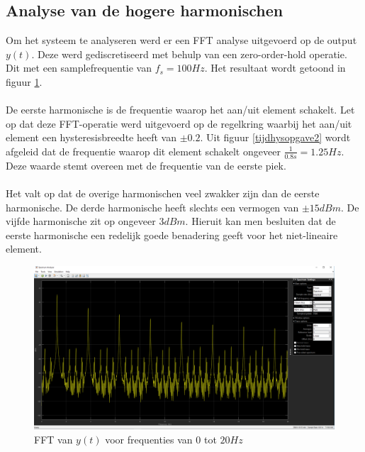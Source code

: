\documentclass[12pt]{article}
\begin{document}
\subsection{Analyse van de hogere harmonischen}
Om het systeem te analyseren werd er een FFT analyse uitgevoerd op de output $y(t)$. Deze werd gediscretiseerd met behulp van een zero-order-hold operatie. Dit met een samplefrequentie van $f_s = 100Hz$. Het resultaat wordt getoond in figuur \ref{spectrum}. \\ \\
De eerste harmonische is de frequentie waarop het aan/uit element schakelt. Let op dat deze FFT-operatie werd uitgevoerd op de regelkring waarbij het aan/uit element een hysteresisbreedte heeft van $\pm0.2$. Uit figuur \ref{tijdhysopgave2} wordt afgeleid dat de frequentie waarop dit element schakelt ongeveer $\frac{1}{0.8s} = 1.25Hz$. Deze waarde stemt overeen met de frequentie van de eerste piek. \\ \\
Het valt op dat de overige harmonischen veel zwakker zijn dan de eerste harmonische. De derde harmonische heeft slechts een vermogen van $\pm 15 dBm$. De vijfde harmonische zit op ongeveer $3 dBm$. Hieruit kan men besluiten dat de eerste harmonische een redelijk goede benadering geeft voor het niet-lineaire element.
\begin{figure}[!h]
	\centering
	\includegraphics[width=\textwidth, keepaspectratio]{spectrum.png}
	\caption{FFT van $y(t)$ voor frequenties van $0$ tot $20Hz$}
	\label{spectrum}
\end{figure}
\end{document}
